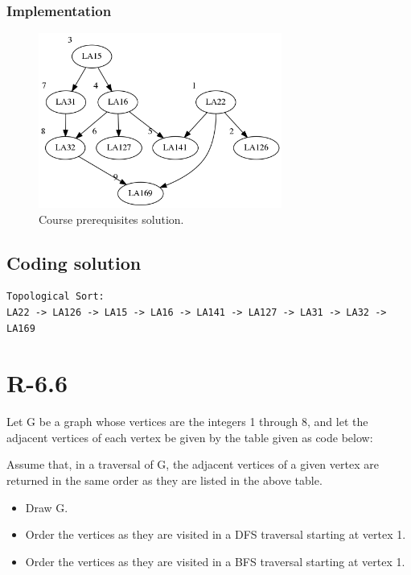 \documentclass[a4paper,12pt]{article}
\begin{document}
\subsubsection*{Implementation}

\begin{figure} 
	\centering
	\includegraphics[width=8cm]{code/gcourses-solution.png} 
	\caption{Course prerequisites solution.}	 
\end{figure}


\subsection*{Coding solution} 
\begin{verbatim}
Topological Sort:
LA22 -> LA126 -> LA15 -> LA16 -> LA141 -> LA127 -> LA31 -> LA32 -> LA169
\end{verbatim}


\section*{R-6.6}
Let G be a graph whose vertices are the integers 1 through 8, and let the adjacent vertices
of each vertex be given by the table given as code below:

\begin{multicols}{3}

\end{multicols}

Assume that, in a traversal of G, the adjacent vertices of a given vertex are returned in the
same order as they are listed in the above table.
\begin {itemize} 
\item Draw G. 
\item Order the vertices as they are visited in a DFS traversal starting at vertex 1.
\item Order the vertices as they are visited in a BFS traversal starting at vertex 1.
\end {itemize}
\end{document}
